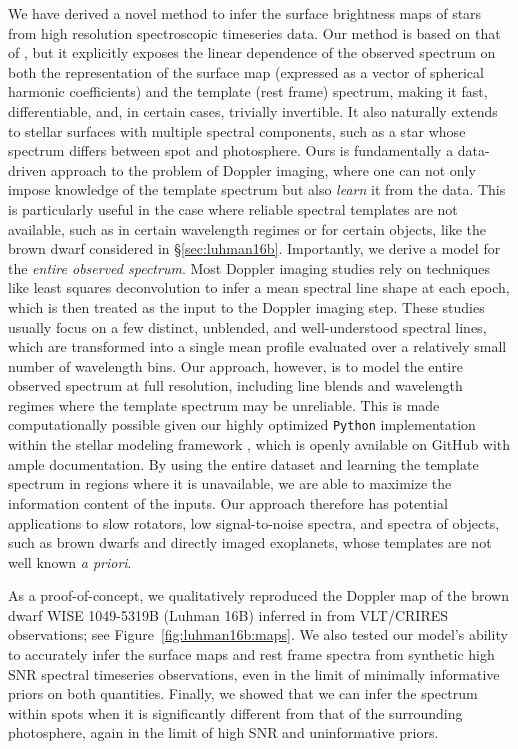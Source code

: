 \documentclass[modern]{aastex631}
\begin{document}
We have derived a novel method to infer the surface brightness maps of stars from high resolution spectroscopic timeseries data.
Our method is based on that of \citet{Vogt1987}, but it explicitly exposes the linear dependence of the observed spectrum on both the representation of the surface map (expressed as a vector of spherical harmonic coefficients) and the template (rest frame) spectrum, making it fast, differentiable, and, in certain cases, trivially invertible.
It also naturally extends to stellar surfaces with multiple spectral components, such as a star whose spectrum differs between spot and photosphere.
Ours is fundamentally a data-driven approach to the problem of Doppler imaging, where one can not only impose knowledge of the template spectrum but also \emph{learn} it from the data.
This is particularly useful in the case where reliable spectral templates are not available, such as in certain wavelength regimes or for certain objects, like the brown dwarf considered in \S\ref{sec:luhman16b}.
Importantly, we derive a model for the \emph{entire observed spectrum}.
Most Doppler imaging studies rely on techniques like least squares deconvolution \citep[LSD;][]{Donati1997} to infer a mean spectral line shape at each epoch, which is then treated as the input to the Doppler imaging step.
These studies usually focus on a few distinct, unblended, and well-understood spectral lines, which are transformed into a single mean profile evaluated over a relatively small number of wavelength bins.
Our approach, however, is to model the entire observed spectrum at full resolution, including line blends and wavelength regimes where the template spectrum may be unreliable.
This is made computationally possible given our highly optimized \texttt{Python} implementation within the \starry stellar modeling framework \citep{Luger2019}, which is openly available on GitHub with ample documentation.
By using the entire dataset and learning the template spectrum in regions where it is unavailable, we are able to maximize the information content of the inputs.
Our approach therefore has potential applications to slow rotators, low signal-to-noise spectra, and spectra of objects, such as brown dwarfs and directly imaged exoplanets, whose templates are not well known \emph{a priori}.

As a proof-of-concept, we qualitatively reproduced the Doppler map of the brown dwarf WISE 1049-5319B (Luhman 16B) inferred in \citet{Crossfield2014} from VLT/CRIRES observations; see Figure~\ref{fig:luhman16b:maps}.
We also tested our model's ability to accurately infer the surface maps and rest frame spectra from synthetic high SNR spectral timeseries observations, even in the limit of minimally informative priors on both quantities. 
Finally, we showed that we can infer the spectrum within spots when it is significantly different from that of the surrounding photosphere, again in the limit of high SNR and uninformative priors.
\end{document}
